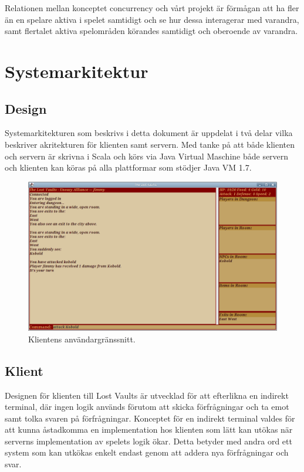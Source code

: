 \documentclass[a4paper]{article}
\begin{document}
Relationen mellan konceptet concurrency och vårt projekt är förmågan att ha fler än en spelare aktiva i spelet samtidigt och se hur dessa interagerar med varandra, samt flertalet 
aktiva spelområden körandes samtidigt och oberoende av varandra.

\section{Systemarkitektur}
\subsection{Design}
Systemarkitekturen som beskrivs i detta dokument är uppdelat i två delar vilka beskriver akritekturen för klienten samt servern. Med tanke på att både klienten och servern är skrivna i Scala och körs via Java Virtual Maschine både servern och klienten kan köras på alla plattformar som stödjer Java VM 1.7.
\begin{figure}[hbt]
\centering
\includegraphics[width=1.0\textwidth]{client}
\caption{\label{fig:Client}Klientens användargränssnitt.}
\end{figure}

\subsection{Klient}
Designen för klienten till Lost Vaults är utvecklad för att efterlikna en indirekt terminal, där ingen logik används förutom att skicka förfrågningar och 
ta emot samt tolka svaren på förfrågningar. Konceptet för en indirekt terminal valdes för att kunna åstadkomma en implementation hos klienten som lätt kan utökas när serverns implementation av spelets logik ökar. Detta betyder med andra ord ett system som kan utkökas enkelt endast genom att addera nya förfrågningar och svar.
\end{document}
